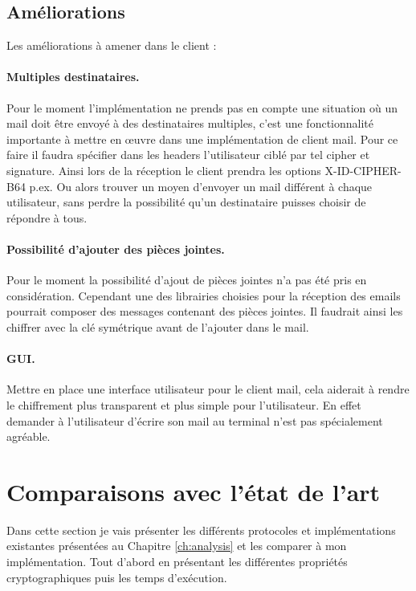 \subsection{Améliorations}
Les améliorations à amener dans le client :
\paragraph*{Multiples destinataires.}
Pour le moment l'implémentation ne prends pas en compte une situation où un mail doit être envoyé à des destinataires multiples, c'est une fonctionnalité importante à mettre en œuvre dans une implémentation de client mail. Pour ce faire il faudra spécifier dans les headers l'utilisateur ciblé par tel cipher et signature. Ainsi lors de la réception le client prendra les options X-ID-CIPHER-B64 p.ex. Ou alors trouver un moyen d'envoyer un mail différent à chaque utilisateur, sans perdre la possibilité qu'un destinataire puisses choisir de répondre à tous.
\paragraph*{Possibilité d'ajouter des pièces jointes.}
Pour le moment la possibilité d'ajout de pièces jointes n'a pas été pris en considération. Cependant une des librairies choisies pour la réception des emails pourrait composer des messages contenant des pièces jointes. Il faudrait ainsi les chiffrer avec la clé symétrique avant de l'ajouter dans le mail.
\paragraph*{GUI.}
Mettre en place une interface utilisateur pour le client mail, cela aiderait à rendre le chiffrement plus transparent et plus simple pour l'utilisateur. En effet demander à l'utilisateur d'écrire son mail au terminal n'est pas spécialement agréable.
\section{Comparaisons avec l'état de l'art}
Dans cette section je vais présenter les différents protocoles et implémentations existantes présentées au Chapitre \ref{ch:analysis} et les comparer à mon implémentation. Tout d'abord en présentant les différentes propriétés cryptographiques puis les temps d'exécution.

